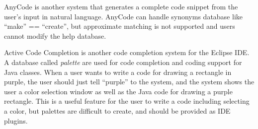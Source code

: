 \documentclass[manuscript,anonymous,review]{acmart}
\begin{document}

AnyCode\cite{Gvero:2015:SJE:2814270.2814295} is another system
that generates a complete code snippet from the user's
input in natural language.
AnyCode can handle synonyms database like ``make'' == ``create'',
but approximate matching is not supported and
users cannot modify the help database.



Active Code Completion\cite{Omar:2012:ACC:2337223.2337324}
is another code completion system for the Eclipse IDE.
A database called \textit{palette} are used for code completion and coding support
for Java classes.
When a user wants to write a code for drawing a rectangle in purple,
the user should just tell ``purple'' to the system,
and the system shows the user a color selection window
as well as the Java code for drawing a purple rectangle.
This is a useful feature for the user to write a code including selecting
a color, but palettes are difficult to create, and should be provided
as IDE plugins.
\end{document}
